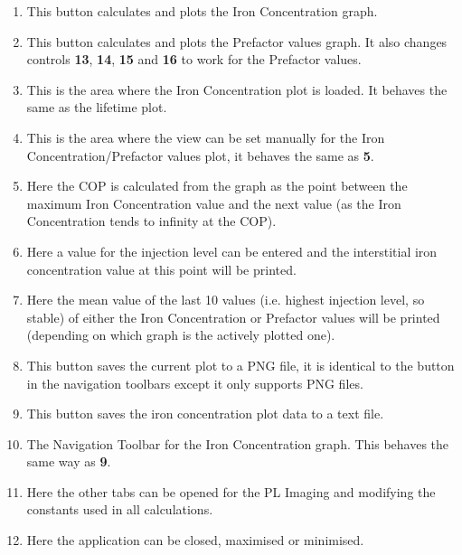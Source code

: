 \documentclass[final,a4paper,oneside,12pt]{article}
\begin{document}
\begin{enumerate}
\item This button calculates and plots the Iron Concentration graph.

\item This button calculates and plots the Prefactor values graph. It also changes controls {\color{red} {\bf 13}}, {\color{red} {\bf 14}}, {\color{red} {\bf 15}} and {\color{red} {\bf 16}} to work for the Prefactor values.

\item This is the area where the Iron Concentration plot is loaded. It behaves the same as the lifetime plot.

\item This is the area where the view can be set manually for the Iron Concentration/Prefactor values plot, it behaves the same as {\color{red} {\bf 5}}.

\item Here the COP is calculated from the graph as the point between the maximum Iron Concentration value and the next value (as the Iron Concentration tends to infinity at the COP).

\item Here a value for the injection level can be entered and the interstitial iron concentration value at this point will be printed.

\item Here the mean value of the last 10 values (i.e. highest injection level, so stable) of either the Iron Concentration or Prefactor values will be printed (depending on which graph is the actively plotted one).

\item This button saves the current plot to a PNG file, it is identical to the button in the navigation toolbars except it only supports PNG files.

\item This button saves the iron concentration plot data to a text file.

\item The Navigation Toolbar for the Iron Concentration graph. This behaves the same way as {\color{red} {\bf 9}}.

\item Here the other tabs can be opened for the PL Imaging and modifying the constants used in all calculations.

\item Here the application can be closed, maximised or minimised.
\end{enumerate}
\end{document}
